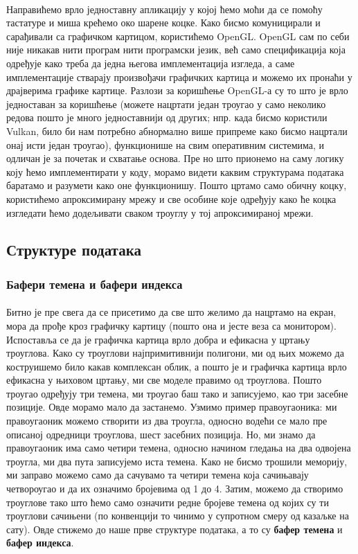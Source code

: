 \documentclass[12pt]{article}
\begin{document}
	\paragraph{}
	Направићемо врло једноставну апликацију у којој ћемо моћи да се помоћу тастатуре и миша крећемо око шарене коцке. Како бисмо комуницирали и сарађивали са графичком картицом, користићемо OpenGL. OpenGL сам по себи није никакав нити програм нити програмски језик, већ само спецификација која одређује како треба да једна његова имплементација изгледа, а саме имплементације стварају произвођачи графичких картица и можемо их пронаћи у драјверима графике картице. Разлози за коришћење OpenGL-а су то што је врло једноставан за коришћење (можете нацртати један троугао у само неколико редова пошто је много једноставнији од других; нпр. када бисмо користили  Vulkan, било би нам потребно абнормално више припреме како бисмо нацртали онај исти један троугао), функционише на свим оперативним системима, и одличан је за почетак и схватање основа. Пре но што  прионемо на саму логику коју ћемо имплементирати у коду, морамо видети каквим структурама података баратамо и разумети како оне функционишу. Пошто цртамо само обичну коцку, користићемо апроксимирану мрежу и све особине које одређују како ће коцка изгледати ћемо додељивати сваком троуглу у тој апроксимираној мрежи.
	
	\subsection{Структуре података}
	
	\subsubsection{Бафери темена и бафери индекса}
	\paragraph{}
	Битно је пре свега да се присетимо да све што желимо да нацртамо на екран, мора да прође кроз графичку картицу (пошто она и јесте веза са монитором). Испоставља се да је графичка картица врло добра и ефикасна у цртању троуглова. Како су троуглови најпримитивнији полигони, ми од њих можемо да коструишемо било какав комплексан облик, а пошто је и графичка картица врло ефикасна у њиховом цртању, ми све моделе правимо од троуглова. Пошто троугао одређују три темена, ми троугао баш тако и записујемо, као три засебне позиције. Овде морамо мало да застанемо. Узмимо пример правоугаоника: ми правоугаоник можемо створити из два троугла, односно водећи се мало пре описаној одредници троуглова, шест засебних позиција. Но, ми знамо да правоугаоник има само четири темена, односно начином гледања на два одвојена троугла,  ми два пута записујемо иста темена. Како не бисмо трошили меморију, ми заправо можемо само да сачувамо та четири темена која сачињавају четвороугао и да их означимо бројевима од 1 до 4. Затим, можемо да створимо троуглове тако што ћемо само означити редне бројеве темена од којих су ти троуглови сачињени (по конвенцији то чинимо у супротном смеру од казаљке на сату). Овде стижемо до наше прве структуре података, а то су \textbf{бафер темена} и \textbf{бафер индекса}.
\end{document}
